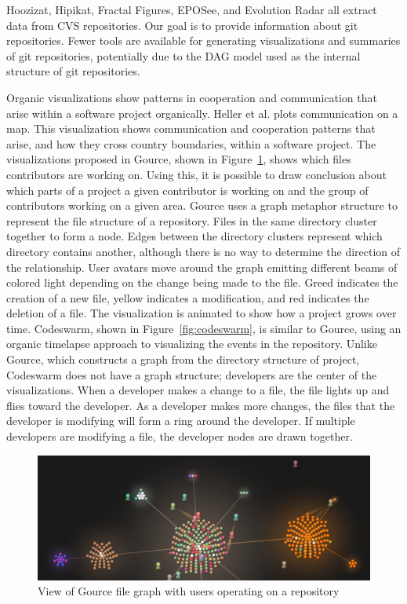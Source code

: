 Hoozizat, Hipikat, Fractal Figures, EPOSee, and Evolution Radar all
extract data from CVS repositories. Our goal is to provide information
about git repositories. Fewer tools are available for generating
visualizations and summaries of git repositories, potentially due to the
DAG model used as the internal structure of git repositories.

Organic visualizations show patterns in cooperation and communication
that arise within a software project organically. Heller et
al.\cite{Heller2011} plots communication on a map. This visualization
shows communication and cooperation patterns that arise, and how they
cross country boundaries, within a software project. The visualizations
proposed in Gource\cite{Caudwell2010}, shown in
Figure~\ref{fig:gource_view}, shows which files contributors are working
on. Using this, it is possible to draw conclusion about which parts of a
project a given contributor is working on and the group of contributors
working on a given area. Gource uses a graph metaphor structure to
represent the file structure of a repository. Files in the same
directory cluster together to form a node. Edges between the directory
clusters represent which directory contains another, although there is
no way to determine the direction of the relationship. User avatars move
around the graph emitting different beams of colored light depending on
the change being made to the file. Greed indicates the creation of a new
file, yellow indicates a modification, and red indicates the deletion of
a file. The visualization is animated to show how a project grows over
time. Codeswarm\cite{ogawa09}, shown in Figure~\ref{fig:codeswarm}, is
similar to Gource, using an organic timelapse approach to visualizing
the events in the repository. Unlike Gource, which constructs a graph
from the directory structure of project, Codeswarm does not have a graph
structure; developers are the center of the visualizations. When a
developer makes a change to a file, the file lights up and flies toward
the developer. As a developer makes more changes, the files that the
developer is modifying will form a ring around the developer. If
multiple developers are modifying a file, the developer nodes are drawn
together.

\begin{figure}[htpb]
  \centering
  \includegraphics[width=0.8\linewidth]{./Figures/introduction/gource-linux.jpg}
  \caption{View of Gource file graph with users operating on a
    repository}
  \label{fig:gource_view}
\end{figure}

